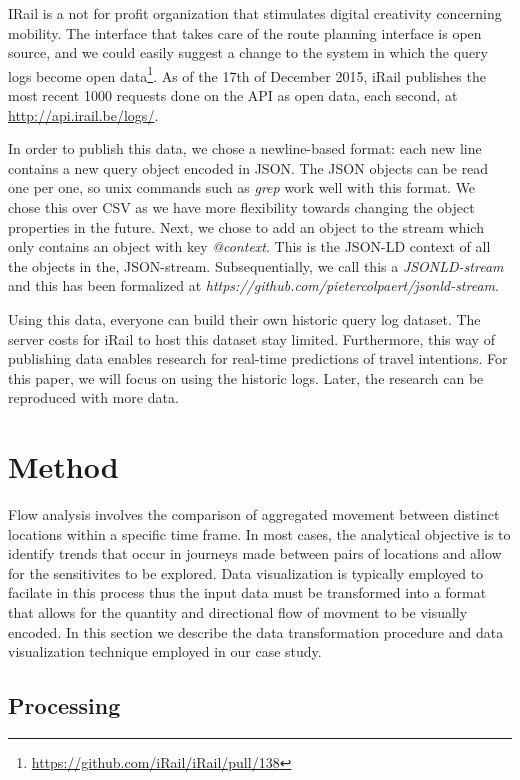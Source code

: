\documentclass{sig-alternate}
\begin{document}
IRail is a not for profit organization that stimulates digital creativity concerning mobility.
The interface that takes care of the route planning interface is open source, and we could easily suggest a change to the system in which the query logs become open data\footnote{\url{https://github.com/iRail/iRail/pull/138}}.
As of the 17th of December 2015, iRail publishes the most recent 1000 requests done on the API as open data, each second, at \url{http://api.irail.be/logs/}.

In order to publish this data, we chose a newline-based format: each new line contains a new query object encoded in JSON. 
The JSON objects can be read one per one, so unix commands such as \emph{grep} work well with this format.
We chose this over CSV as we have more flexibility towards changing the object properties in the future.
Next, we chose to add an object to the stream which only contains an object with key \emph{@context}.
This is the JSON-LD context of all the objects in the, JSON-stream. Subsequentially, we call this a \emph{JSONLD-stream} and this has been formalized at \emph{https://github.com/pietercolpaert/jsonld-stream}.

Using this data, everyone can build their own historic query log dataset.
The server costs for iRail to host this dataset stay limited.
Furthermore, this way of publishing data enables research for real-time predictions of travel intentions.
For this paper, we will focus on using the historic logs.
Later, the research can be reproduced with more data. 

\section{Method}
\label{sec:method}

Flow analysis involves the comparison of aggregated movement between distinct locations within a specific time frame. 
In most cases, the analytical objective is to identify trends that occur in journeys made between pairs of locations and allow for the sensitivites to be explored. 
Data visualization is typically employed to facilate in this process thus the input data must be transformed into a format that allows for the quantity and directional flow of movment to be visually encoded. In this section we describe the data transformation procedure and data visualization technique employed in our case study.

\subsection{Processing}
\end{document}
